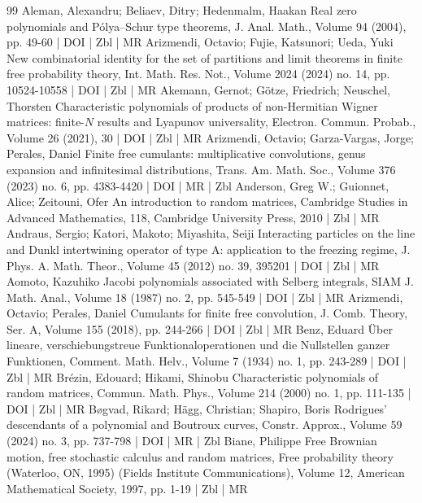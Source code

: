 \begin{thebibliography}{99}
Aleman, Alexandru; Beliaev, Ditry; Hedenmalm, Haakan Real zero polynomials and Pólya–Schur type theorems, J. Anal. Math., Volume 94 (2004), pp. 49-60 | DOI | Zbl | MR
Arizmendi, Octavio; Fujie, Katsunori; Ueda, Yuki New combinatorial identity for the set of partitions and limit theorems in finite free probability theory, Int. Math. Res. Not., Volume 2024 (2024) no. 14, pp. 10524-10558 | DOI | Zbl | MR
Akemann, Gernot; Götze, Friedrich; Neuschel, Thorsten Characteristic polynomials of products of non-Hermitian Wigner matrices: finite-${N}$ results and Lyapunov universality, Electron. Commun. Probab., Volume 26 (2021), 30 | DOI | Zbl | MR
Arizmendi, Octavio; Garza-Vargas, Jorge; Perales, Daniel Finite free cumulants: multiplicative convolutions, genus expansion and infinitesimal distributions, Trans. Am. Math. Soc., Volume 376 (2023) no. 6, pp. 4383-4420 | DOI | MR | Zbl
Anderson, Greg W.; Guionnet, Alice; Zeitouni, Ofer An introduction to random matrices, Cambridge Studies in Advanced Mathematics, 118, Cambridge University Press, 2010 | Zbl | MR
Andraus, Sergio; Katori, Makoto; Miyashita, Seiji Interacting particles on the line and Dunkl intertwining operator of type A: application to the freezing regime, J. Phys. A. Math. Theor., Volume 45 (2012) no. 39, 395201 | DOI | Zbl | MR
Aomoto, Kazuhiko Jacobi polynomials associated with Selberg integrals, SIAM J. Math. Anal., Volume 18 (1987) no. 2, pp. 545-549 | DOI | Zbl | MR
Arizmendi, Octavio; Perales, Daniel Cumulants for finite free convolution, J. Comb. Theory, Ser. A, Volume 155 (2018), pp. 244-266 | DOI | Zbl | MR
Benz, Eduard Über lineare, verschiebungstreue Funktionaloperationen und die Nullstellen ganzer Funktionen, Comment. Math. Helv., Volume 7 (1934) no. 1, pp. 243-289 | DOI | Zbl | MR
Brézin, Edouard; Hikami, Shinobu Characteristic polynomials of random matrices, Commun. Math. Phys., Volume 214 (2000) no. 1, pp. 111-135 | DOI | Zbl | MR
Bøgvad, Rikard; Hägg, Christian; Shapiro, Boris Rodrigues’ descendants of a polynomial and Boutroux curves, Constr. Approx., Volume 59 (2024) no. 3, pp. 737-798 | DOI | MR | Zbl
Biane, Philippe Free Brownian motion, free stochastic calculus and random matrices, Free probability theory (Waterloo, ON, 1995) (Fields Institute Communications), Volume 12, American Mathematical Society, 1997, pp. 1-19 | Zbl | MR

\end{thebibliography}

